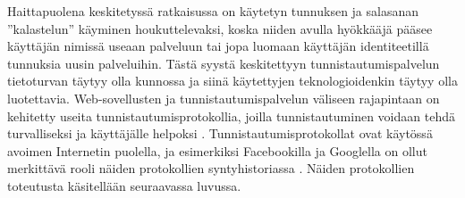 Haittapuolena keskitetyssä ratkaisussa on käytetyn tunnuksen ja salasanan ''kalastelun'' käyminen houkuttelevaksi, koska niiden avulla hyökkääjä pääsee käyttäjän nimissä useaan palveluun tai jopa luomaan käyttäjän identiteetillä tunnuksia uusin palveluihin. Tästä syystä keskitettyyn tunnistautumispalvelun tietoturvan täytyy olla kunnossa ja siinä käytettyjen teknologioidenkin täytyy olla luotettavia. Web-sovellusten ja tunnistautumispalvelun väliseen rajapintaan on kehitetty useita tunnistautumisprotokollia, joilla tunnistautuminen voidaan tehdä turvalliseksi ja käyttäjälle helpoksi \cite{open_identity}. Tunnistautumisprotokollat ovat käytössä avoimen Internetin puolella, ja esimerkiksi Facebookilla ja Googlella on ollut merkittävä rooli näiden protokollien syntyhistoriassa \cite{open_identity}. Näiden protokollien toteutusta käsitellään seuraavassa luvussa.